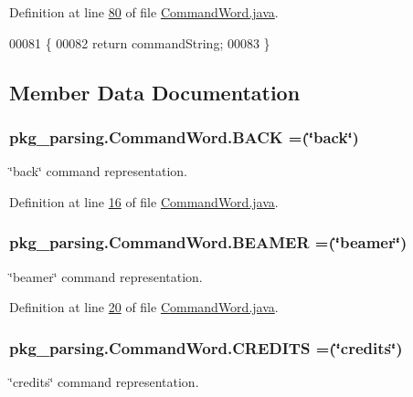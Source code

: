 Definition at line \hyperlink{CommandWord_8java_source_l00080}{80} of file \hyperlink{CommandWord_8java_source}{Command\-Word.\-java}.


\begin{DoxyCode}
00081     \{
00082         \textcolor{keywordflow}{return} commandString;
00083     \}
\end{DoxyCode}


\subsection{Member Data Documentation}
\hypertarget{enumpkg__parsing_1_1CommandWord_a7c6d90e3ff897725acfab8f68b28a1b1}{
\subsubsection[{B\-A\-C\-K}]{\setlength{\rightskip}{0pt plus 5cm}pkg\-\_\-parsing.\-Command\-Word.\-B\-A\-C\-K =(\char`\"{}back\char`\"{})}}\label{enumpkg__parsing_1_1CommandWord_a7c6d90e3ff897725acfab8f68b28a1b1}
\char`\"{}back\char`\"{} command representation. 

Definition at line \hyperlink{CommandWord_8java_source_l00016}{16} of file \hyperlink{CommandWord_8java_source}{Command\-Word.\-java}.

\hypertarget{enumpkg__parsing_1_1CommandWord_a4d1c3647eaf81664624ed5effc590be4}{
\subsubsection[{B\-E\-A\-M\-E\-R}]{\setlength{\rightskip}{0pt plus 5cm}pkg\-\_\-parsing.\-Command\-Word.\-B\-E\-A\-M\-E\-R =(\char`\"{}beamer\char`\"{})}}\label{enumpkg__parsing_1_1CommandWord_a4d1c3647eaf81664624ed5effc590be4}
\char`\"{}beamer\char`\"{} command representation. 

Definition at line \hyperlink{CommandWord_8java_source_l00020}{20} of file \hyperlink{CommandWord_8java_source}{Command\-Word.\-java}.

\hypertarget{enumpkg__parsing_1_1CommandWord_a4267a564de4d81cec28764b1eeb3ce22}{
\subsubsection[{C\-R\-E\-D\-I\-T\-S}]{\setlength{\rightskip}{0pt plus 5cm}pkg\-\_\-parsing.\-Command\-Word.\-C\-R\-E\-D\-I\-T\-S =(\char`\"{}credits\char`\"{})}}\label{enumpkg__parsing_1_1CommandWord_a4267a564de4d81cec28764b1eeb3ce22}
\char`\"{}credits\char`\"{} command representation. 

